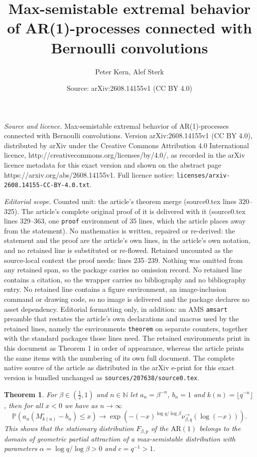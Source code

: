 \documentclass[10pt,a4paper]{amsart}
\title{Max-semistable extremal behavior of AR(1)-processes connected with Bernoulli convolutions}
\author{Peter Kern, Alef Sterk}
\date{Source: arXiv:2608.14155v1 (CC BY 4.0)}
\newtheorem{theorem}{Theorem}
\newcommand{\AR}{\operatorname{AR(1)}}
\newcommand{\Pm}{{\mathbb P}}
\newcommand{\nat}{{\mathbb N}}
\begin{document}
\maketitle

\noindent\emph{Source and licence.} Max-semistable extremal behavior of AR(1)-processes connected with Bernoulli convolutions. Version arXiv:2608.14155v1 (CC BY 4.0), distributed by arXiv under the Creative Commons Attribution 4.0 International licence, http://creativecommons.org/licenses/by/4.0/, as recorded in the arXiv licence metadata for this exact version and shown on the abstract page https://arxiv.org/abs/2608.14155v1. Full licence notice: \texttt{licenses/arxiv-2608.14155-CC-BY-4.0.txt}.\par\smallskip

\noindent\textit{Editorial scope.} Counted unit: the article's theorem merge (source0.tex lines 320--325). The article's complete original proof of it is delivered with it (source0.tex lines 329--363, one \texttt{proof} environment of 35 lines, which the article places away from the statement). No mathematics is written, repaired or re-derived: the statement and the proof are the article's own lines, in the article's own notation, and no retained line is substituted or re-flowed.  Retained uncounted as the source-local context the proof needs: lines 235--239.  Nothing was omitted from any retained span, so the package carries no omission record.  No retained line contains a citation, so the wrapper carries no bibliography and no bibliography entry.  No retained line contains a figure environment, an image-inclusion command or drawing code, so no image is delivered and the package declares no asset dependency.  Editorial formatting only, in addition: an AMS \texttt{amsart} preamble that restates the article's own declarations and macros used by the retained lines, namely the environments \texttt{theorem} on separate counters, together with the standard packages those lines need.  The retained environments print in this document as Theorem 1 in order of appearance, whereas the article prints the same items with the numbering of its own full document.  The complete native source of the article as distributed in the arXiv e-print for this exact version is bundled unchanged as \texttt{sources/207638/source0.tex}.
\begin{theorem}\label{maxsdoa}
For $\beta\in(\frac12,1)$ and $n\in\nat$ let $a_{n}=\beta^{-n}$, $b_{n}=1$ and $k(n)=\lfloor q^{-n}\rfloor$, then for all $x<0$ we have as $n\to\infty$
$$\Pm\left(a_{n}(M_{k(n)}^{\circ}-b_{n})\leq x\right)\to\exp\left(-(-x)^{\log q/\log\beta}\nu_{\beta,q}^{\to}(\log(-x))\right).$$
This shows that the stationary distribution $F_{\beta,p}$ of the $\AR$ belongs to the domain of geometric partial attraction of a max-semistable distribution with parameters $\alpha=\log q/\log\beta>0$ and $c=q^{-1}>1$.
\end{theorem}
\end{document}
